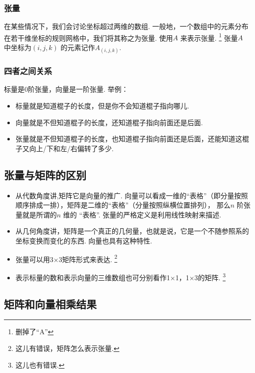\subsubsection{张量}
\begin{defination}
  在某些情况下，我们会讨论坐标超过两维的数组.
  一般地，一个数组中的元素分布在若干维坐标的规则网格中，我们将其称之为张量.
  使用\(A\) 来表示张量.
  \footnote{删掉了``A''}
  张量\(A\) 中坐标为\((i,j,k)\) 的元素记作\(A_{(i,j,k)}\).  
\end{defination}
\subsubsection{四者之间关系}
\begin{remark}
  标量是0阶张量，向量是一阶张量.
  举例：
  \begin{itemize}
  \item ​标量就是知道棍子的长度，但是你不会知道棍子指向哪儿.
  \item ​向量就是不但知道棍子的长度，还知道棍子指向前面还是后面.
  \item ​张量就是不但知道棍子的长度，也知道棍子指向前面还是后面，还能知道这棍子又向上/下和左/右偏转了多少.
  \end{itemize}
\end{remark}

\subsection{张量与矩阵的区别}
\label{ux5f20ux91cfux4e0eux77e9ux9635ux7684ux533aux522b}

\begin{itemize}
\item
  从代数角度讲,矩阵它是向量的推广.
  向量可以看成一维的``表格''（即分量按照顺序排成一排），矩阵是二维的``表格''（分量按照纵横位置排列），  那么\(n\) 阶张量就是所谓的\(n\) 维的 ``表格''.
  张量的严格定义是利用线性映射来描述.
\item  从几何角度讲，矩阵是一个真正的几何量，也就是说，它是一个不随参照系的坐标变换而变化的东西.
  向量也具有这种特性.
\item
  张量可以用3×3矩阵形式来表达.
  \footnote{这儿有错误，矩阵怎么表示张量.}
\item
  表示标量的数和表示向量的三维数组也可分别看作1×1，1×3的矩阵.
  \footnote{这儿也有错误.}
\end{itemize}

\subsection{矩阵和向量相乘结果}
\label{ux77e9ux9635ux548cux5411ux91cfux76f8ux4e58ux7ed3ux679c}

